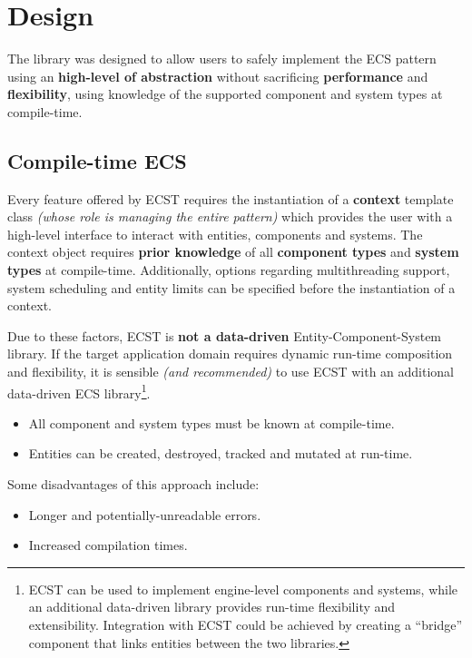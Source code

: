 \documentclass[twoside, 12pt, a4paper, openany]{book}
\begin{document}
\section{Design}\label{design}

The library was designed to allow users to safely implement the ECS
pattern using an \textbf{high-level of abstraction} without sacrificing
\textbf{performance} and \textbf{flexibility}, using knowledge of the
supported component and system types at compile-time.

\subsection{Compile-time ECS}\label{compile-time-ecs}

Every feature offered by ECST requires the instantiation of a
\textbf{context} template class \emph{(whose role is managing the entire
pattern)} which provides the user with a high-level interface to
interact with entities, components and systems. The context object
requires \textbf{prior knowledge} of all \textbf{component types} and
\textbf{system types} at compile-time. Additionally, options regarding
multithreading support, system scheduling and entity limits can be
specified before the instantiation of a context.

Due to these factors, ECST is \textbf{not a data-driven}
Entity-Component-System library. If the target application domain
requires dynamic run-time composition and flexibility, it is sensible
\emph{(and recommended)} to use ECST with an additional data-driven ECS
library\footnote{ECST can be used to implement engine-level components
  and systems, while an additional data-driven library provides run-time
  flexibility and extensibility. Integration with ECST could be achieved
  by creating a ``bridge'' component that links entities between the two
  libraries.}.

\begin{itemize}
\item
  All component and system types must be known at compile-time.
\item
  Entities can be created, destroyed, tracked and mutated at run-time.
\end{itemize}

Some disadvantages of this approach include:

\begin{itemize}
\item
  Longer and potentially-unreadable errors.
\item
  Increased compilation times.
\end{itemize}
\end{document}
